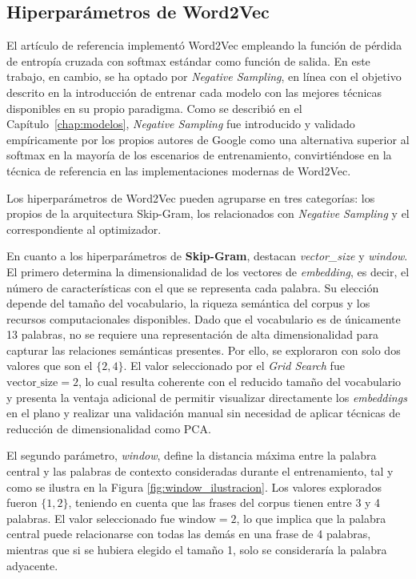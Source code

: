 \subsection{Hiperparámetros de Word2Vec}

El artículo de referencia \cite{ohno_qword2vec_2025} implementó Word2Vec empleando la función de pérdida de entropía cruzada con softmax estándar como función de salida. En este trabajo, en cambio, se ha optado por \textit{Negative Sampling}, en línea con el objetivo descrito en la introducción de entrenar cada modelo con las mejores técnicas disponibles en su propio paradigma. Como se describió en el Capítulo~\ref{chap:modelos}, \textit{Negative Sampling} fue introducido y validado empíricamente por los propios autores de Google \cite{mikolov_skipgram_phrases_2013} como una alternativa superior al softmax en la mayoría de los escenarios de entrenamiento, convirtiéndose en la técnica de referencia en las implementaciones modernas de Word2Vec.

Los hiperparámetros de Word2Vec pueden agruparse en tres categorías: los propios de la arquitectura Skip-Gram, los relacionados con \textit{Negative Sampling} y el correspondiente al optimizador.

En cuanto a los hiperparámetros de \textbf{Skip-Gram}, destacan \textit{vector\_size} y \textit{window}. El primero determina la dimensionalidad de los vectores de \textit{embedding}, es decir, el número de características con el que se representa cada palabra. Su elección depende del tamaño del vocabulario, la riqueza semántica del corpus y los recursos computacionales disponibles. Dado que el vocabulario es de únicamente 13 palabras, no se requiere una representación de alta dimensionalidad para capturar las relaciones semánticas presentes. Por ello, se exploraron con solo dos valores que son el $\{2, 4\}$. El valor seleccionado por el \textit{Grid Search} fue $\text{vector\_size} = 2$, lo cual resulta coherente con el reducido tamaño del vocabulario y presenta la ventaja adicional de permitir visualizar directamente los \textit{embeddings} en el plano y realizar una validación manual sin necesidad de aplicar técnicas de reducción de dimensionalidad como PCA.

El segundo parámetro, \textit{window}, define la distancia máxima entre la palabra central y las palabras de contexto consideradas durante el entrenamiento, tal y como se ilustra en la Figura \ref{fig:window_ilustracion}. Los valores explorados fueron $\{1, 2\}$, teniendo en cuenta que las frases del corpus tienen entre 3 y 4 palabras. El valor seleccionado fue $\text{window} = 2$, lo que implica que la palabra central puede relacionarse con todas las demás en una frase de 4 palabras, mientras que si se hubiera elegido el tamaño 1, solo se consideraría la palabra adyacente.


